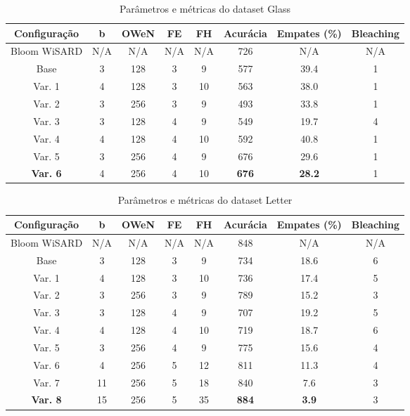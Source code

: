 \documentclass{article}
\begin{document}
{\begin{table}[H]
\caption{Parâmetros e métricas do dataset Glass}
\begin{tabular}{|c|c|c|c|c|c|c|c|}
\hline
\textbf{Configuração} & \textbf{b} & \textbf{OWeN} & \textbf{FE} & \textbf{FH} & \textbf{Acurácia} & \textbf{Empates (\%)} & \textbf{Bleaching} \\
\hline
Bloom WiSARD & N/A & N/A & N/A & N/A & 726 & N/A & N/A \\
\hline
Base & 3 & 128 & 3 & 9 & 577 & 39.4 & 1 \\
\hline
Var. 1 & 4 & 128 & 3 & 10 & 563 & 38.0 & 1 \\
\hline
Var. 2 & 3 & 256 & 3 & 9 & 493 & 33.8 & 1 \\
\hline
Var. 3 & 3 & 128 & 4 & 9 & 549 & 19.7 & 4 \\
\hline
Var. 4 & 4 & 128 & 4 & 10 & 592 & 40.8 & 1 \\
\hline
Var. 5 & 3 & 256 & 4 & 9 & 676 & 29.6 & 1 \\
\hline
\textbf{Var. 6} & 4 & 256 & 4 & 10 & \textbf{676} & \textbf{28.2} & 1 \\
\hline
\end{tabular}
\end{table}

\begin{table}[H]
\caption{Parâmetros e métricas do dataset Letter}
\begin{tabular}{|c|c|c|c|c|c|c|c|}
\hline
\textbf{Configuração} & \textbf{b} & \textbf{OWeN} & \textbf{FE} & \textbf{FH} & \textbf{Acurácia} & \textbf{Empates (\%)} & \textbf{Bleaching} \\
\hline
Bloom WiSARD & N/A & N/A & N/A & N/A & 848 & N/A & N/A \\
\hline
Base & 3 & 128 & 3 & 9 & 734 & 18.6 & 6 \\
\hline
Var. 1 & 4 & 128 & 3 & 10 & 736 & 17.4 & 5 \\
\hline
Var. 2 & 3 & 256 & 3 & 9 & 789 & 15.2 & 3 \\
\hline
Var. 3 & 3 & 128 & 4 & 9 & 707 & 19.2 & 5 \\
\hline
Var. 4 & 4 & 128 & 4 & 10 & 719 & 18.7 & 6 \\
\hline
Var. 5 & 3 & 256 & 4 & 9 & 775 & 15.6 & 4 \\
\hline
Var. 6 & 4 & 256 & 5 & 12 & 811 & 11.3 & 4 \\
\hline
Var. 7 & 11 & 256 & 5 & 18 & 840 & 7.6 & 3 \\
\hline
\textbf{Var. 8} & 15 & 256 & 5 & 35 & \textbf{884} & \textbf{3.9} & 3 \\
\hline
\end{tabular}
\end{table}

}
\end{document}
